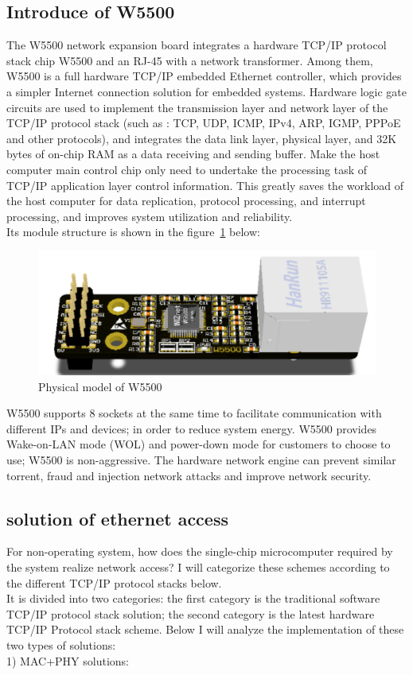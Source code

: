 \subsection{Introduce of W5500}
\label{sec:Introduce of W5500}
The W5500 network expansion board integrates a hardware TCP/IP protocol stack chip W5500 and an RJ-45 with a network transformer. Among them, W5500 is a full hardware TCP/IP embedded Ethernet controller, which provides a simpler Internet connection solution for embedded systems. Hardware logic gate circuits are used to implement the transmission layer and network layer of the TCP/IP protocol stack (such as : TCP, UDP, ICMP, IPv4, ARP, IGMP, PPPoE and other protocols), and integrates the data link layer, physical layer, and 32K bytes of on-chip RAM as a data receiving and sending buffer. Make the host computer main control chip only need to undertake the processing task of TCP/IP application layer control information. This greatly saves the workload of the host computer for data replication, protocol processing, and interrupt processing, and improves system utilization and reliability. 
\\
Its module structure is shown in the figure~\ref{fig:2.6} below:
\\
\begin{figure}[h]
	\centering
	\includegraphics[width=13cm]{grafiken/2.6.pdf}
	\caption{Physical model of W5500} 
	\label{fig:2.6}
\end{figure}
W5500 supports 8 sockets at the same time to facilitate communication with different IPs and devices; in order to reduce system energy. W5500 provides Wake-on-LAN mode (WOL) and power-down mode for customers to choose to use; W5500 is non-aggressive. The hardware network engine can prevent similar torrent, fraud and injection network attacks and improve network security.

\subsection{solution of ethernet access}
\label{sec:solution of ethernet access}
For non-operating system, how does the single-chip microcomputer required by the system realize network access? I will categorize these schemes according to the different TCP/IP protocol stacks below.
\\
It is divided into two categories: the first category is the traditional software TCP/IP protocol stack solution; the second category is the latest hardware TCP/IP
Protocol stack scheme. Below I will analyze the implementation of these two types of solutions: 
\\
1) MAC+PHY solutions:

